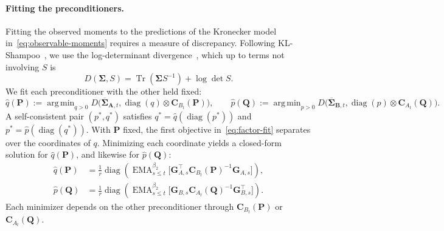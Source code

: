 \documentclass[11pt]{article}
\newcommand{\mat}[1]{\bm{#1}}
\DeclareMathOperator{\diag}{diag}
\DeclareMathOperator{\Tr}{Tr}
\DeclareMathOperator{\EMA}{EMA}
\DeclareMathOperator*{\argmin}{arg\,min}
\begin{document}
\paragraph{Fitting the preconditioners.} Fitting the observed moments
to the predictions of the Kronecker model
in~\eqref{eq:observable-moments} requires a measure of discrepancy. Following
KL-Shampoo~\cite{klshampoo}, we use the log-determinant
divergence~\cite{logdetdiv}, which up to terms not involving $S$ is
\[
  D(\mat{\Sigma},S)=\Tr(\mat{\Sigma} S^{-1})+\log\det S.
\]
We fit each preconditioner with the other held fixed:
\begin{equation}\label{eq:factor-fit}
  \hat q(\mat{P}):=\argmin_{q>0}
    D\bigl(\overline{\mat{\Sigma}}_{\mat{A},t},\diag(q)\otimes \mat{C}_{B_t}(\mat{P})\bigr),
  \qquad
  \hat p(\mat{Q}):=\argmin_{p>0}
    D\bigl(\overline{\mat{\Sigma}}_{\mat{B},t},\diag(p)\otimes \mat{C}_{A_t}(\mat{Q})\bigr).
\end{equation}
A self-consistent pair $(p^*,q^*)$ satisfies $q^*=\hat q(\diag(p^*))$ and $p^*=\hat p(\diag(q^*))$. With $\mat{P}$ fixed, the first objective in~\eqref{eq:factor-fit} separates over the coordinates of $q$. Minimizing each coordinate yields a closed-form solution for $\hat q(\mat{P})$, and likewise for $\hat p(\mat{Q})$:
\begin{equation}\label{eq:conditional-minimizers}
\begin{aligned}
  \hat q(\mat{P})&=\frac1r\diag\left(\EMA^{\beta_2}_{s\le t}\bigl[\mat{G}_{A,s}^\top \mat{C}_{B_t}(\mat{P})^{-1}\mat{G}_{A,s}\bigr]\right),\\
  \hat p(\mat{Q})&=\frac1r\diag\left(\EMA^{\beta_2}_{s\le t}\bigl[\mat{G}_{B,s} \mat{C}_{A_t}(\mat{Q})^{-1}\mat{G}_{B,s}^\top\bigr]\right).
\end{aligned}
\end{equation}
Each minimizer depends on the other preconditioner through
$\mat{C}_{B_t}(\mat{P})$ or $\mat{C}_{A_t}(\mat{Q})$.
\end{document}
